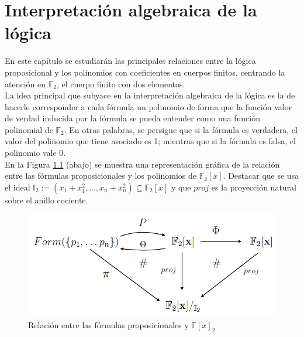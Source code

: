\chapter{Interpretación algebraica de la lógica}\label{sec:interp}

En este capítulo se estudiarán las principales relaciones entre la lógica proposicional y los 
polinomios con coeficientes en cuerpos finitos, centrando la atención en $\mathbb{F}_2$, 
el cuerpo finito con dos elementos.\\

La idea principal que subyace en la interpretación algebraica de la lógica es la de hacerle corresponder a cada fórmula un polinomio de forma que la función valor de verdad inducida por la fórmula se pueda entender como una función polinomial de $\mathbb{F}_2$. En otras palabras, se persigue que si la fórmula es verdadera, el valor del polinomio que tiene asociado es 1; mientras que si la fórmula es falsa, el polinomio vale 0.\\

En la Figura \ref{fig:esquema} (abajo) se muestra una representación gráfica de la relación entre las fórmulas proposicionales y los polinomios de $\mathbb{F}_2[x]$. Destacar que se usa el ideal $\mathbb{I}_2 :=(x_1+x_1^2,...,x_n+x_n^2)\subseteq\mathbb{F}_2[x]$ y que $proj$ es la proyección natural sobre el anillo cociente.

\vspace{0.5cm}
\begin{figure}[h]
	\centering
		\includegraphics[scale=0.46]{imagenes/conmu.png}
	\caption{Relación entre las fórmulas proposicionales y $\mathbb{F}[x]_2$}
	\label{fig:esquema}
\end{figure}
\vspace{0.5cm}

